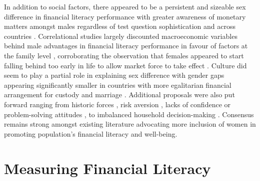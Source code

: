 \documentclass[a4paper,11pt,UKenglish,twoside,openright]{report}\usepackage[]{graphicx}\usepackage[]{color}
\begin{document}
In addition to social factors, there appeared to be a persistent and sizeable sex difference in financial literacy performance with greater awareness of monetary matters amongst males \parencite{atkinson:2011, lusardi:2010} regardless of test question sophistication \parencite{agnew:2015a, agnew:2015b} and across countries \parencite{bucherkoenen:2017}. Correlational studies largely discounted macroeconomic variables behind male advantages in financial literacy performance \parencite{chambers:2018} in favour of factors at the family level \parencite{chambers:2019}, corroborating the observation that females appeared to start falling behind too early in life \parencite{driva:2016} to allow market force to take effect \parencite{preston:2019}. Culture did seem to play a partial role in explaining sex difference \parencite{grohmann:2016} with gender gaps appearing significantly smaller in countries with more egalitarian financial arrangement for custody and marriage \parencite{hospido:2021}. Additional proposals were also put forward ranging from historic forces \parencite{bottazzi:2020}, risk aversion \parencite{chen:2018}, lacks of confidence \parencite{bucherkoenen:2021, danes:2007} or problem-solving attitudes \parencite{longobardi:2018}, to imbalanced household decision-making \parencite{fonseca:2012}. Consensus remains strong amongst existing literature advocating more inclusion of women in promoting population's financial literacy and well-being.

\section{Measuring Financial Literacy}
\end{document}
